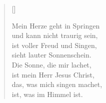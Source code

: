 \begin{center}
\settowidth{\versewidth}{Der, vor dem die Welt erschrickt,}
\begin{verse}[\versewidth]



 Mein Herze geht in Springen\\
und kann nicht traurig sein,\\
ist voller Freud und Singen,\\
sieht lauter Sonnenschein.\\
Die Sonne, die mir lachet,\\
ist mein Herr Jesus Christ,\\
das, was mich singen machet,\\
ist, was im Himmel ist.

\end{verse}
\end{center}

